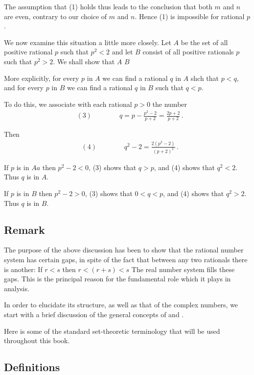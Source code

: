 The assumption that (1) holds thus leads to the conclusion that both $m$ and $n$ are even, contrary to our choice of $m$ and $n$. Hence (1) is impossible for rational $p$. 

We now examine this situation a little more closely. Let $A$ be the set of all positive rational $p$ such that $p^2 < 2$ and let $B$ consist of all positive rationals $p$ such that $p^2 > 2$. We shall show that $A$  $B$ 

More explicitly, for every $p$ in $A$ we can find a rational $q$ in $A$ shch that $p < q$, and for every $p$ in $B$ we can find a rational $q$ in $B$ such that $q < p$. 

To do this, we associate with each rational $p > 0$ the number 
\begin{align*}
&(3) \quad\quad\quad\quad q = p - \frac{p^2 - 2}{p + 2} = \frac{2p + 2}{p + 2}\,.
\end{align*}

Then 
\begin{align*}
&(4) \quad\quad\quad\quad q^2 - 2 = \frac{2 (p^2 - 2)}{(p + 2)^2}\,.
\end{align*}

If $p$ is in $Aa$ then $p^2 - 2 < 0$, (3) shows that $q > p$, and (4) shows that $q^2 < 2$. Thus $q$ is in $A$. 

If $p$ is in $B$ then $p^2 -2 > 0$, (3) shows that $0 < q < p$, and (4) shows that $q^2 > 2$. Thus $q$ is in $B$. 

\subsection{Remark}\label{ssec:1.2}
The purpose of the above discussion has been to show that the rational number system has certain gaps, in spite of the fact that between any two rationals there is another: If $r < s$ then $r < (r + s) < s$ The real number system fills these gaps. This is the principal reason for the fundamental role which it plays in analysis. 

In order to elucidate its structure, as well as that of the complex numbers, we start with a brief discussion of the general concepts of  and .

Here is some of the standard set-theoretic terminology that will be used throughout this book. 

\subsection{Definitions}\label{ssec:1.3}
    





